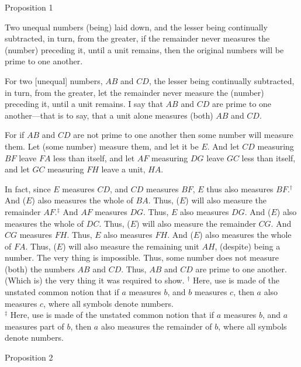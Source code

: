 \begin{center}
{\large Proposition 1}
\end{center}

Two unequal numbers (being) laid down, and
the lesser being continually subtracted, in turn,  from the greater, if the remainder never measures the (number) preceding it, until   a unit remains, 
then the original numbers will be prime to one another.

\epsfysize=1.8in
\centerline{}

For  two [unequal] numbers, $AB$ and $CD$, the lesser being continually
subtracted, in turn, from the greater, let the remainder never measure the (number) preceding it, until a unit remains. I say that $AB$ and
$CD$ are prime to one another---that is to say, that a unit alone measures
(both) $AB$ and $CD$.

For if $AB$ and $CD$ are not prime to one another then some number will measure
 them. Let (some number) measure  them, and let it be $E$. And let $CD$ measuring $BF$ leave $FA$
less than itself, and let $AF$ measuring $DG$ leave $GC$ less than itself, and 
let $GC$ measuring $FH$ leave a unit, $HA$.

In fact, since $E$ measures $CD$, and $CD$ measures $BF$, $E$ thus also measures
$BF$.$^\dag$ 
And ($E$) also measures the whole of $BA$. Thus, ($E$) will also measure the
remainder $AF$.$^\ddag$  And $AF$ measures $DG$. Thus, $E$ also
measures $DG$. And ($E$) also measures the whole of $DC$. Thus, ($E$) will
also measure the remainder $CG$. And $CG$ measures $FH$. Thus, $E$ also measures $FH$. And ($E$) also measures the whole of $FA$. Thus, ($E$) will also measure the remaining unit $AH$, (despite) being a number. The very thing is impossible.
Thus, some number does not measure (both) the numbers $AB$ and $CD$.
Thus, $AB$ and $CD$ are prime to one another. (Which is) the very thing it
was required to show.
{\footnotesize\noindent$^\dag$ Here, use is made of the unstated common notion that if
$a$ measures $b$, and $b$ measures $c$, then $a$ also measures $c$,
where all symbols denote numbers.\\[0.5ex]
$^\ddag$ Here, use is made of the unstated common notion
that if $a$ measures $b$, and $a$ measures part of $b$, then $a$
also measures the remainder of $b$, where all
symbols denote numbers.}


\begin{center}
{\large Proposition 2}
\end{center}

